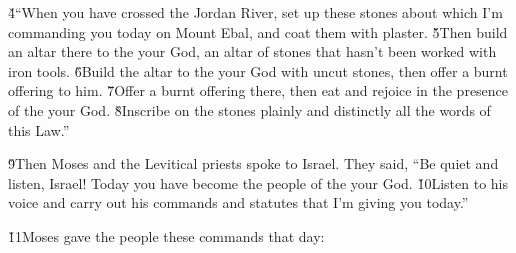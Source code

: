 \v{4}``When you have crossed the Jordan River, set up these stones about which I'm commanding you today on Mount Ebal, and coat them with plaster. \v{5}Then build an altar there to the  your God, an altar of stones that hasn't been worked with iron tools. \v{6}Build the altar to the  your God with uncut stones, then offer a burnt offering to him. \v{7}Offer a burnt offering there, then eat and rejoice in the presence of the  your God. \v{8}Inscribe on the stones plainly and distinctly all the words of this Law.''

\v{9}Then Moses and the Levitical priests spoke to Israel. They said, ``Be quiet and listen, Israel! Today you have become the people of the  your God. \v{10}Listen to his voice and carry out his commands and statutes that I'm giving you today.''

\v{11}Moses gave the people these commands that day:

